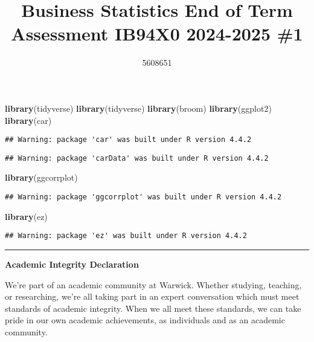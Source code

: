 \documentclass[
]{article}
\title{Business Statistics End of Term Assessment IB94X0 2024-2025 \#1}
\author{5608651}
\date{}
\newenvironment{Shaded}{\begin{snugshade}}{\end{snugshade}}
\newcommand{\FunctionTok}[1]{\textcolor[rgb]{0.13,0.29,0.53}{\textbf{#1}}}
\newcommand{\NormalTok}[1]{#1}
\begin{document}
\maketitle

{
\setcounter{tocdepth}{3}
\tableofcontents
}
\begin{Shaded}
\begin{Highlighting}[]
\FunctionTok{library}\NormalTok{(tidyverse)}
\FunctionTok{library}\NormalTok{(tidyverse)}
\FunctionTok{library}\NormalTok{(broom)}
\FunctionTok{library}\NormalTok{(ggplot2)}
\FunctionTok{library}\NormalTok{(car)}
\end{Highlighting}
\end{Shaded}

\begin{verbatim}
## Warning: package 'car' was built under R version 4.4.2
\end{verbatim}

\begin{verbatim}
## Warning: package 'carData' was built under R version 4.4.2
\end{verbatim}

\begin{Shaded}
\begin{Highlighting}[]
\FunctionTok{library}\NormalTok{(ggcorrplot)}
\end{Highlighting}
\end{Shaded}

\begin{verbatim}
## Warning: package 'ggcorrplot' was built under R version 4.4.2
\end{verbatim}

\begin{Shaded}
\begin{Highlighting}[]
\FunctionTok{library}\NormalTok{(ez)}
\end{Highlighting}
\end{Shaded}

\begin{verbatim}
## Warning: package 'ez' was built under R version 4.4.2
\end{verbatim}

\begin{center}\rule{0.5\linewidth}{0.5pt}\end{center}

\textbf{Academic Integrity Declaration}

We're part of an academic community at Warwick. Whether studying,
teaching, or researching, we're all taking part in an expert
conversation which must meet standards of academic integrity. When we
all meet these standards, we can take pride in our own academic
achievements, as individuals and as an academic community.
\end{document}
